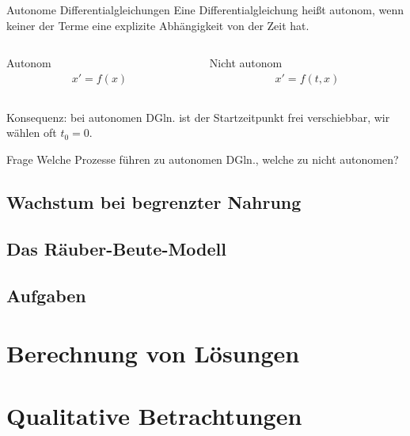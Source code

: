 \documentclass[notheorems,hidelinks,aspectratio=1610]{beamer}
\begin{document}
\begin{frame}
  \begin{block}{Autonome Differentialgleichungen}
    Eine Differentialgleichung heißt autonom, wenn keiner der Terme
    eine explizite Abhängigkeit von der Zeit hat.
  \end{block}
  \begin{columns}
    \begin{column}[t]{.5\textwidth}
      \begin{block}{Autonom}
        \begin{gather*}
          x' = f(x)
        \end{gather*}
      \end{block}
    \end{column}
    \begin{column}[t]{.5\textwidth}
      \begin{block}{Nicht autonom}
        \begin{gather*}
          x' = f(t,x)
        \end{gather*}
      \end{block}
    \end{column}
  \end{columns}
  \pause Konsequenz: bei autonomen DGln. ist der Startzeitpunkt frei
  verschiebbar, wir wählen oft $t_0 = 0$.
  \begin{exampleblock}{Frage}
    Welche Prozesse führen zu autonomen DGln., welche zu nicht autonomen?
  \end{exampleblock}
\end{frame}

\subsection{Wachstum bei begrenzter Nahrung}
\frame{\subtoc}
\subsection{Das Räuber-Beute-Modell}
\frame{\subtoc}
\subsection{Aufgaben}
\frame{\subtoc}

\section{Berechnung von Lösungen}
\frame{\sectoc}

\section{Qualitative Betrachtungen}
\frame{\sectoc}
\end{document}
